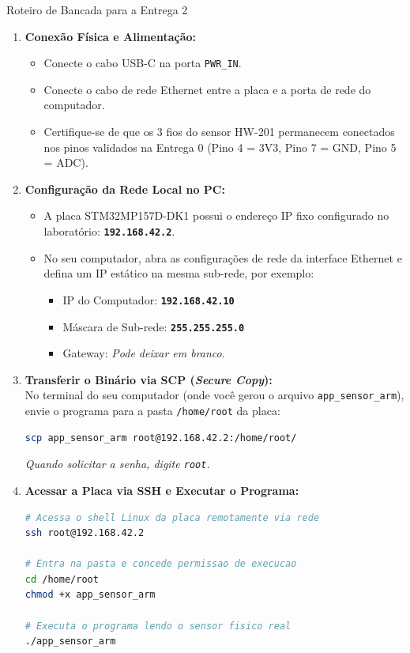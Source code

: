 \documentclass[11pt,a4paper]{article}
\begin{document}
\begin{labbox}{Roteiro de Bancada para a Entrega 2}
\begin{enumerate}[leftmargin=*]
    \item \textbf{Conexão Física e Alimentação:}
    \begin{itemize}
        \item Conecte o cabo USB-C na porta \texttt{PWR\_IN}.
        \item Conecte o cabo de rede Ethernet entre a placa e a porta de rede do computador.
        \item Certifique-se de que os 3 fios do sensor HW-201 permanecem conectados nos pinos validados na Entrega 0 (Pino 4 = 3V3, Pino 7 = GND, Pino 5 = ADC).
    \end{itemize}
    \item \textbf{Configuração da Rede Local no PC:}
    \begin{itemize}
        \item A placa STM32MP157D-DK1 possui o endereço IP fixo configurado no laboratório: \textbf{\texttt{192.168.42.2}}.
        \item No seu computador, abra as configurações de rede da interface Ethernet e defina um IP estático na mesma sub-rede, por exemplo:
        \begin{itemize}
            \item IP do Computador: \textbf{\texttt{192.168.42.10}}
            \item Máscara de Sub-rede: \textbf{\texttt{255.255.255.0}}
            \item Gateway: \textit{Pode deixar em branco}.
        \end{itemize}
    \end{itemize}
    \item \textbf{Transferir o Binário via SCP (\textit{Secure Copy}):} \\
    No terminal do seu computador (onde você gerou o arquivo \texttt{app\_sensor\_arm}), envie o programa para a pasta \texttt{/home/root} da placa:
\begin{lstlisting}[language=bash]
scp app_sensor_arm root@192.168.42.2:/home/root/
\end{lstlisting}
    \textit{Quando solicitar a senha, digite \texttt{root}.}
    
    \item \textbf{Acessar a Placa via SSH e Executar o Programa:}
\begin{lstlisting}[language=bash]
# Acessa o shell Linux da placa remotamente via rede
ssh root@192.168.42.2

# Entra na pasta e concede permissao de execucao
cd /home/root
chmod +x app_sensor_arm

# Executa o programa lendo o sensor fisico real
./app_sensor_arm
\end{lstlisting}
\end{enumerate}
\end{labbox}
\end{document}
